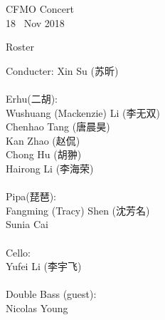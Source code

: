 \documentclass[letter,6pt,poets]{ConcProg}
\begin{document}
\begin{programme}{
    CFMO Concert
\\  {\normalsize 18 ~Nov 2018}
}
\begin{part}[]
  \end{part}
  
  
\end{programme}
\begin{center}
Roster
\end{center}

\begin{multicols}{2}%


Conducter: Xin Su (苏昕)
\\
\\
 Erhu(二胡):                 \\
Wushuang (Mackenzie) Li (李无双)   \\
Chenhao Tang  (唐晨昊) \\
Kan Zhao (赵侃)\\
Chong Hu (胡翀)\\
Hairong Li (李海荣)\\
\\
Pipa(琵琶):\\
Fangming (Tracy) Shen (沈芳名)\\
Sunia Cai\\

\\
Cello:\\
Yufei Li (李宇飞)\\
\\
Double Bass (guest):\\
Nicolas Young\\
\\


\end{multicols}
\end{document}
